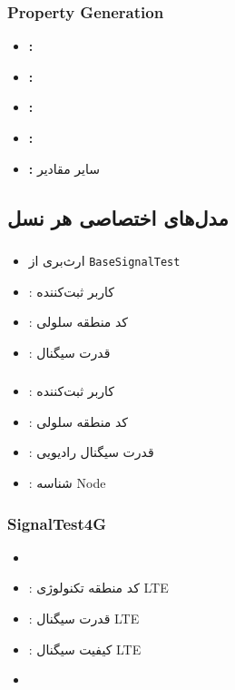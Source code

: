 \documentclass{report}
\begin{document}
\subsubsection{Property Generation}
\begin{itemize}
    \item \textbf{:} 
    \item \textbf{:} 
    \item \textbf{:} 
    \item \textbf{:} 
    \item \textbf{:} سایر مقادیر
\end{itemize}

\subsection{مدل‌های اختصاصی هر نسل}

\subsubsection{}
\begin{itemize}
    \item ارث‌بری از \texttt{BaseSignalTest}
    \item \texttt{}: کاربر ثبت‌کننده
    \item \texttt{}: کد منطقه سلولی
    \item \texttt{}: قدرت سیگنال
\end{itemize}

\subsubsection{}
\begin{itemize}
    \item \texttt{}: کاربر ثبت‌کننده
    \item \texttt{}: کد منطقه سلولی
    \item \texttt{}: قدرت سیگنال رادیویی
    \item \texttt{}: شناسه Node
\end{itemize}

\subsubsection{SignalTest4G}
\begin{itemize}
    \item \texttt{}
    \item \texttt{}: کد منطقه تکنولوژی LTE
    \item \texttt{}: قدرت سیگنال LTE
    \item \texttt{}: کیفیت سیگنال LTE
    \item \texttt{}
\end{itemize}
\end{document}
